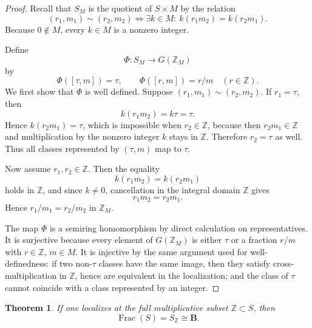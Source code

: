 \documentclass[11pt]{article}
\newtheorem{theorem}{Theorem}[section]
\theoremstyle{definition}
\newcommand{\Z}{\mathbb Z}
\newcommand{\B}{\mathbf B}
\newcommand{\Frac}{\operatorname{Frac}}
\newcommand{\taup}{\tau}
\begin{document}
\begin{proof}
Recall that \(S_M\) is the quotient of \(S\times M\) by the relation
\[
(r_1,m_1)\sim (r_2,m_2)
\iff
\exists k\in M:\ k(r_1m_2)=k(r_2m_1).
\]
Because \(0\notin M\), every \(k\in M\) is a nonzero integer.

Define
\[
\Phi:S_M\longrightarrow G(\Z_M)
\]
by
\[
\Phi([\taup,m])=\taup,
\qquad
\Phi([r,m])=r/m\quad (r\in\Z).
\]
We first show that \(\Phi\) is well defined.  Suppose \((r_1,m_1)\sim(r_2,m_2)\).
If \(r_1=\taup\), then
\[
k(r_1m_2)=k\taup=\taup.
\]
Hence \(k(r_2m_1)=\taup\), which is impossible when \(r_2\in\Z\), because then \(r_2m_1\in\Z\) and multiplication by the nonzero integer \(k\) stays in \(\Z\).  Therefore \(r_2=\taup\) as well.  Thus all classes represented by \((\taup,m)\) map to \(\taup\).

Now assume \(r_1,r_2\in\Z\).  Then the equality
\[
k(r_1m_2)=k(r_2m_1)
\]
holds in \(\Z\), and since \(k\neq0\), cancellation in the integral domain \(\Z\) gives
\[
r_1m_2=r_2m_1.
\]
Hence \(r_1/m_1=r_2/m_2\) in \(\Z_M\).

The map \(\Phi\) is a semiring homomorphism by direct calculation on representatives.  It is surjective because every element of \(G(\Z_M)\) is either \(\taup\) or a fraction \(r/m\) with \(r\in\Z\), \(m\in M\).  It is injective by the same argument used for well-definedness: if two non-\(\taup\) classes have the same image, then they satisfy cross-multiplication in \(\Z\), hence are equivalent in the localization; and the class of \(\taup\) cannot coincide with a class represented by an integer.
\end{proof}

\begin{theorem}\label{thm:frac-collapse}
If one localizes at the full multiplicative subset \(\Z\subset S\), then
\[
\Frac(S)=S_{\Z}\cong \B.
\]
\end{theorem}
\end{document}
